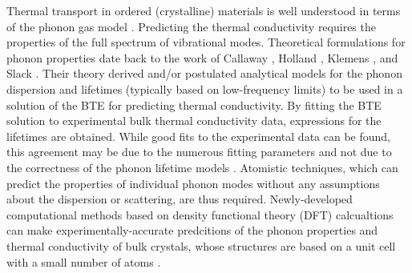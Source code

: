 Thermal transport in ordered (crystalline) materials is well understood 
in terms of the phonon gas model 
\cite{maradudin_dynamical_1974,wallace_thermodynamics_1972,
srivastava_physics_1990,dove_introduction_1993,ziman_electrons_2001}. 
Predicting the thermal conductivity requires the properties of the 
full spectrum of vibrational modes. 
Theoretical formulations for phonon properties date back to the work of 
Callaway \cite{callaway_model_1959}, 
Holland \cite{holland_analysis_1963}, 
Klemens \cite{klemens_scattering_1955}, 
and Slack \cite{slack_thermal_1979}. Their theory derived and/or 
postulated analytical models for the phonon dispersion and lifetimes 
(typically based on low-frequency limits) to be used in a solution 
of the BTE for predicting thermal conductivity. By fitting the
BTE solution to experimental bulk thermal conductivity data, expressions 
for the lifetimes are obtained. While good fits to the experimental 
data can be found, this agreement may be due to the numerous fitting 
parameters and not due to the correctness of the phonon lifetime models 
\cite{chung_role_2004}. 
Atomistic techniques, which can predict the properties of individual phonon
modes without any assumptions about the dispersion or scattering, 
are thus required. Newly-developed computational methods based on density 
functional theory (DFT) calcualtions can make experimentally-accurate 
predcitions of the phonon properties and thermal conductivity of bulk 
crystals, whose structures are based on a unit cell with a small number of 
atoms \cite{broido_intrinsic_2007,ward_ab_2009,ward_intrinsic_2010,
esfarjani_heat_2011,lindsay_thermal_2012,shiga_microscopic_2012,
luckyanova_coherent_2012,lindsay_first-principles_2013}. 

